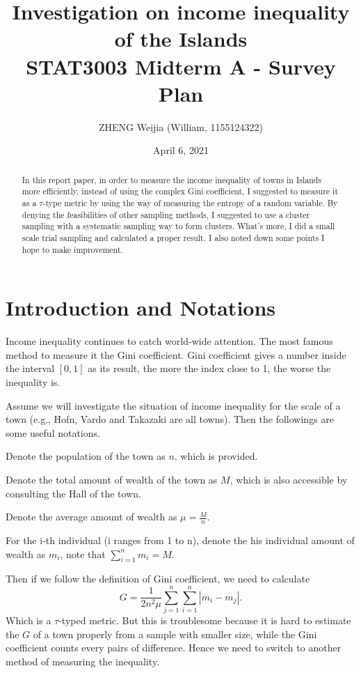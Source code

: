 \documentclass[12pt]{article}%
\begin{document}
\title{Investigation on income inequality of the Islands\\
\Large STAT3003 Midterm A - Survey Plan}
\author{ZHENG Weijia (William, 1155124322)}
\date{April 6, 2021}
\maketitle

\begin{abstract}
    In this report paper, in order to measure the income inequality of towns in Islands more efficiently, instead of using the complex Gini coefficient,  
    I suggested to measure it as a $\tau$-type metric by using the way of measuring the entropy of a random variable.
    By denying the feasibilities of other sampling methods, I suggested to use a cluster sampling with a systematic sampling way to form clusters. 
    What's more, I did a small scale trial sampling and calculated a proper result. I also noted down some points I hope to make improvement.

\end{abstract}

\section{Introduction and Notations}
Income inequality continues to catch world-wide attention. The most famous method to measure it the Gini coefficient. 
Gini coefficient gives a number inside the interval $[0,1]$ as its result, the more the index close to 1, the worse the inequality is.

Assume we will investigate the situation of income inequality for the scale of a town (e.g., Hofn, Vardo and Takazaki are all towns).
Then the followings are some useful notations.

Denote the population of the town as $n$, which is provided.

Denote the total amount of wealth of the town as $M$, which is also accessible by consulting the Hall of the town.

Denote the average amount of wealth as $\mu = \frac{M}{n}$.

For the i-th individual (i ranges from 1 to n), denote the his individual amount of wealth as $m_i$, note that $\sum_{i=1}^{n}m_i=M.$

Then if we follow the definition of Gini coefficient, we need to calculate $$G=\frac{1}{2n^2\mu}\sum_{j=1}^{n}\sum_{i=1}^{n}|m_i-m_j|.$$
Which is a $\tau$-typed metric. But this is troublesome because it is hard to estimate the $G$ of a town properly from a sample with smaller size, 
while the Gini coefficient counts every pairs of difference. 
Hence we need to switch to another method of measuring the inequality.
\end{document}
